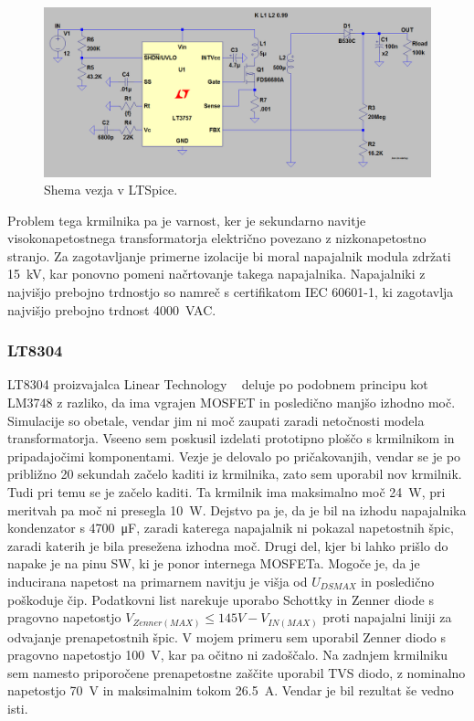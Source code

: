 \documentclass[a4paper,twoside,openright,12pt,Slovene]{book}
\begin{document}
    \begin{figure}[H]
        \centering
        \includegraphics[width=1\columnwidth]{Slike/Simulacije/LM3757spice.png}
        \caption{\label{LM3757spice} Shema vezja v LTSpice.}
    \end{figure}
    
Problem tega krmilnika pa je varnost, ker je sekundarno navitje visokonapetostnega transformatorja električno povezano z nizkonapetostno stranjo. Za zagotavljanje primerne izolacije bi moral napajalnik modula zdržati \SI{15}{\kilo\volt}, kar ponovno pomeni načrtovanje takega napajalnika. Napajalniki z najvišjo prebojno trdnostjo so namreč s certifikatom IEC 60601-1, ki zagotavlja najvišjo prebojno trdnost \SI{4000}{\volt}AC.

	\subsubsection{LT8304} \label{LT8304}
LT8304 proizvajalca Linear Technology ~\cite{analog:LT8304} deluje po podobnem principu kot LM3748 z razliko, da ima vgrajen MOSFET in posledično manjšo izhodno moč. Simulacije so obetale, vendar jim ni moč zaupati zaradi netočnosti modela transformatorja. Vseeno sem poskusil izdelati prototipno ploščo s krmilnikom in pripadajočimi komponentami. Vezje je delovalo po pričakovanjih, vendar se je po približno 20 sekundah začelo kaditi iz krmilnika, zato sem uporabil nov krmilnik.
Tudi pri temu se je začelo kaditi. Ta krmilnik ima maksimalno moč \SI{24}{\watt}, pri meritvah pa moč ni presegla \SI{10}{\watt}. Dejstvo pa je, da je bil na izhodu napajalnika kondenzator s \SI{4700}{\micro\farad}, zaradi katerega napajalnik ni pokazal napetostnih špic, zaradi katerih je bila presežena izhodna moč. Drugi del, kjer bi lahko prišlo do napake je na pinu SW, ki je ponor internega MOSFETa. Mogoče je, da je inducirana napetost na primarnem navitju je višja od \(U_{DS MAX}\) in posledično poškoduje čip. Podatkovni list narekuje uporabo Schottky in Zenner diode s pragovno napetostjo \(V_{Zenner(MAX)} \leq 145 V - V_{IN(MAX)}\) proti napajalni liniji za odvajanje prenapetostnih špic. V mojem primeru sem uporabil Zenner diodo s pragovno napetostjo \SI{100}{\volt}, kar pa očitno ni zadoščalo. Na zadnjem krmilniku sem namesto priporočene prenapetostne zaščite uporabil TVS diodo, z nominalno napetostjo \SI{70}{\volt} in maksimalnim tokom \SI{26.5}{\ampere}. Vendar je bil rezultat še vedno isti.
\end{document}
